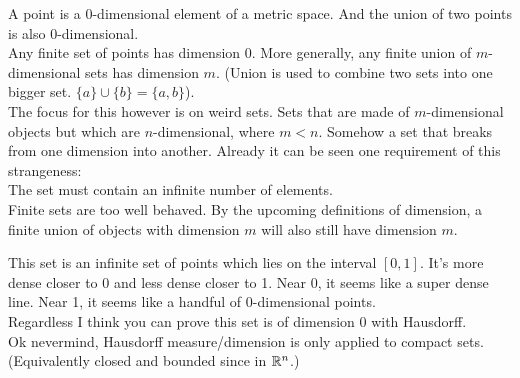 \documentclass[11pt]{ekblite}
\begin{document}
\begin{example}
	A point is a 0-dimensional element of a metric space. And the union of two points is also 0-dimensional.
	\\[0.2in]Any finite set of points has dimension 0. More generally, any finite union of $m$-dimensional sets has dimension $m$. (Union is used to combine two sets into one bigger set. $\{a\} \cup \{b\} = \{a,b\}$).
	\\[0.2in]The focus for this however is on weird sets. Sets that are made of $m$-dimensional objects but which are $n$-dimensional, where $m < n$. Somehow a set that breaks from one dimension into another. Already it can be seen one requirement of this strangeness:
	\\[0.2in]The set must contain an infinite number of elements.
	\\[0.2in]Finite sets are too well behaved. By the upcoming definitions of dimension, a finite union of objects with dimension $m$ will also still have dimension $m$. 
\end{example}
\begin{example}
	This set is an infinite set of points which lies on the interval $[0,1]$. It's more dense closer to 0 and less dense closer to 1. Near 0, it seems like a super dense line. Near 1, it seems like a handful of 0-dimensional points.
	\\[0.2in]Regardless I think you can prove this set is of dimension 0 with Hausdorff.
	\\[0.2in]Ok nevermind, Hausdorff measure/dimension is only applied to compact sets. (Equivalently closed and bounded since in $\mathbb{R}^n$.)
\end{example}
\newpage
\end{document}
